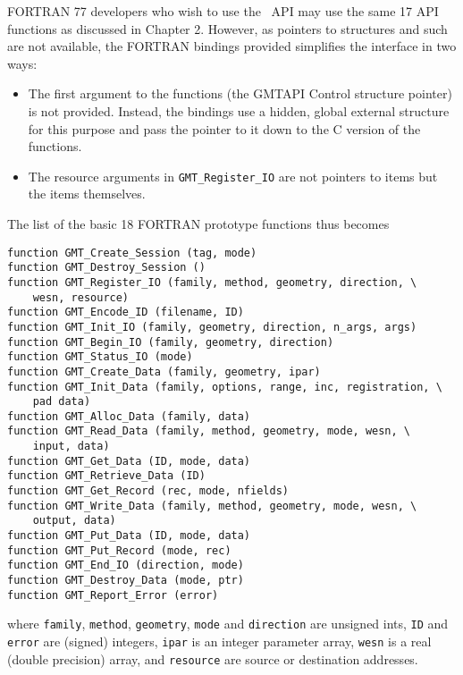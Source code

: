 \documentclass[11pt]{report}
\begin{document}
FORTRAN 77 developers who wish to use the \GMT\ API may use the same 17 API functions as discussed in Chapter 2.
However, as pointers to structures and such are not available, the FORTRAN bindings provided simplifies the
interface in two ways:
\begin{itemize}
\item The first argument to the functions (the GMTAPI Control structure pointer) is not provided.  Instead,
the bindings use a hidden, global external structure for this purpose and pass the pointer to it down to
the C version of the functions.
\item The resource arguments in \texttt{GMT\_Register\_IO} are not pointers to
items but the items themselves.
\end{itemize}
The list of the basic 18 FORTRAN prototype functions thus becomes
\begin{verbatim}
function GMT_Create_Session (tag, mode)
function GMT_Destroy_Session ()
function GMT_Register_IO (family, method, geometry, direction, \
    wesn, resource)
function GMT_Encode_ID (filename, ID)
function GMT_Init_IO (family, geometry, direction, n_args, args)
function GMT_Begin_IO (family, geometry, direction)
function GMT_Status_IO (mode)
function GMT_Create_Data (family, geometry, ipar)
function GMT_Init_Data (family, options, range, inc, registration, \
    pad data)
function GMT_Alloc_Data (family, data)
function GMT_Read_Data (family, method, geometry, mode, wesn, \
    input, data)
function GMT_Get_Data (ID, mode, data)
function GMT_Retrieve_Data (ID)
function GMT_Get_Record (rec, mode, nfields)
function GMT_Write_Data (family, method, geometry, mode, wesn, \
    output, data)
function GMT_Put_Data (ID, mode, data)
function GMT_Put_Record (mode, rec)
function GMT_End_IO (direction, mode)
function GMT_Destroy_Data (mode, ptr)
function GMT_Report_Error (error)
\end{verbatim}
where \texttt{family}, \texttt{method}, \texttt{geometry}, \texttt{mode} and \texttt{direction}
are unsigned ints, \texttt{ID} and \texttt{error} are (signed) integers,
\texttt{ipar} is an integer parameter array, \texttt{wesn} is a real (double precision) array,
and \texttt{resource} are source or destination addresses.

\clearpage
\printindex
\end{document}
